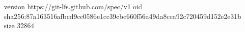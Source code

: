 version https://git-lfs.github.com/spec/v1
oid sha256:87a163516afbcd9cc0586e1cc39cbc660f56a49da8cea92c720459d152e2e31b
size 32864
